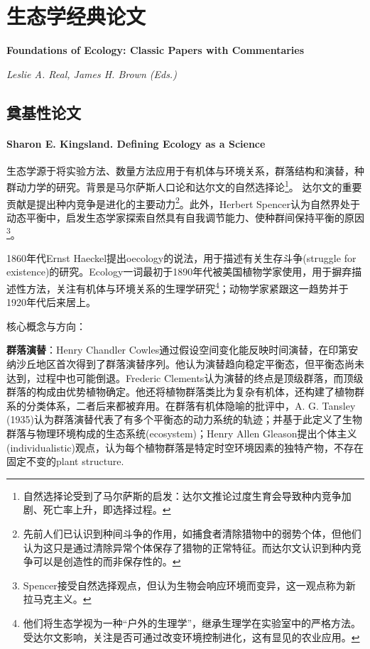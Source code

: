 \chapter{生态学经典论文}
\Large\textbf{Foundations of Ecology: Classic Papers with Commentaries}
\par \emph{Leslie A. Real, James H. Brown (Eds.)} \normalsize

\section{奠基性论文}

\subsubsection*{Sharon E. Kingsland. Defining Ecology as a Science}

生态学源于将实验方法、数量方法应用于有机体与环境关系，群落结构和演替，种群动力学的研究。背景是马尔萨斯人口论和达尔文的自然选择论\footnote{自然选择论受到了马尔萨斯的启发：达尔文推论过度生育会导致种内竞争加剧、死亡率上升，即选择过程。}。 达尔文的重要贡献是提出种内竞争是进化的主要动力\footnote{先前人们已认识到种间斗争的作用，如捕食者清除猎物中的弱势个体，但他们认为这只是通过清除异常个体保存了猎物的正常特征。而达尔文认识到种内竞争可以是创造性的而非保存性的。}。此外，Herbert Spencer认为自然界处于动态平衡中，启发生态学家探索自然具有自我调节能力、使种群间保持平衡的原因\footnote{Spencer接受自然选择观点，但认为生物会响应环境而变异，这一观点称为新拉马克主义。}。

1860年代Ernst Haeckel提出oecology的说法，用于描述有关生存斗争(struggle for existence)的研究。Ecology一词最初于1890年代被美国植物学家使用，用于摒弃描述性方法，关注有机体与环境关系的生理学研究\footnote{他们将生态学视为一种“户外的生理学”，继承生理学在实验室中的严格方法。受达尔文影响，关注是否可通过改变环境控制进化，这有显见的农业应用。}；动物学家紧跟这一趋势并于1920年代后来居上。

核心概念与方向：

\textbf{群落演替}：Henry Chandler Cowles通过假设空间变化能反映时间演替，在印第安纳沙丘地区首次得到了群落演替序列。他认为演替趋向稳定平衡态，但平衡态尚未达到，过程中也可能倒退。Frederic Clements认为演替的终点是顶级群落，而顶级群落的构成由优势植物确定。他还将植物群落类比为复杂有机体，还构建了植物群系的分类体系，二者后来都被弃用。在群落有机体隐喻的批评中，A. G. Tansley (1935)认为群落演替代表了有多个平衡态的动力系统的轨迹；并基于此定义了生物群落与物理环境构成的生态系统(ecosystem)；Henry Allen Gleason提出个体主义(individualistic)观点，认为每个植物群落是特定时空环境因素的独特产物，不存在固定不变的plant structure.


